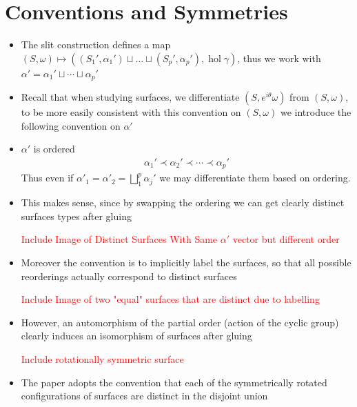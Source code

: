 \documentclass[20pt]{article}
\theoremstyle{definition}
\newcommand{\hol}{\operatorname{hol}}
\begin{document}
    \section{Conventions and Symmetries}
    \begin{itemize}
        \item The slit construction defines a map \((S,\omega) \mapsto ((S_1', \alpha_1') \sqcup \hdots \sqcup (S_p', \alpha_p'),\hol{\gamma})\), thus we work with \(\alpha' = \alpha_1' \sqcup \cdots \sqcup \alpha_p'\)
        \item Recall that when studying surfaces, we differentiate \((S,e^{i\theta}\omega)\) from \((S,\omega)\), to be more easily consistent with this convention on \((S,\omega)\) we introduce the following convention on \(\alpha'\)
        \item \(\alpha'\) is ordered
        \begin{align*}
            \alpha_1' \prec \alpha_2' \prec \cdots \prec \alpha_p'
        \end{align*}
        Thus even if \(\alpha'_1 = \alpha'_2 = \bigsqcup_1^p \alpha_j'\) we may differentiate them based on ordering.
        \item This makes sense, since by swapping the ordering we can get clearly distinct surfaces types after gluing
        
        \textcolor{red}{Include Image of Distinct Surfaces With Same \(\alpha'\) vector but different order}

        \item Moreover the convention is to implicitly label the surfaces, so that all possible reorderings actually correspond to distinct surfaces
        
        \textcolor{red}{Include Image of two "equal" surfaces that are distinct due to labelling}

        \item However, an automorphism of the partial order (action of the cyclic group) clearly induces an isomorphism of surfaces after gluing
        
        \textcolor{red}{Include rotationally symmetric surface}

        \item The paper adopts the convention that each of the symmetrically rotated configurations of surfaces are distinct in the disjoint union
        

\end{itemize}
\end{document}
